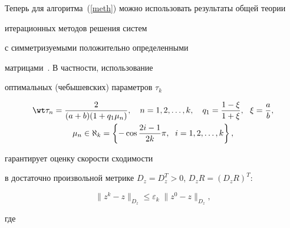 




Теперь для алгоритма~(\ref{meth}) можно использовать результаты общей теории


итерационных методов решения систем 


с симметризуемыми положительно определенными


матрицами~\cite{SamNik}. В частности, использование


оптимальных (чебышевских) параметров $\tau_k$


\begin{gather*}


\wt \tau_{n} = \dfrac2{(a + b)(1 + q_1 \mu_n)},


\quad n = 1, 2, \dotsc, k,\quad


q_1 = \frac{1-\xi}{1+\xi},\ \ \xi = \frac{a}{b}, \\


%


\mu_n \in \aleph_k = \left\{ - \cos \dfrac{2i -1}{2k} \pi, \ \;


i = 1, 2, \dotsc, k \right\},


\end{gather*}


гарантирует оценку скорости сходимости


в достаточно произвольной метрике $ D_z = D_z^T > 0$, $D_z R = (D_z R)^T$:


$$


\| z^{k} - z \|_{D_z} \leq \varepsilon_k \;\| z^0 - z \|_{D_z} ,


$$


где


